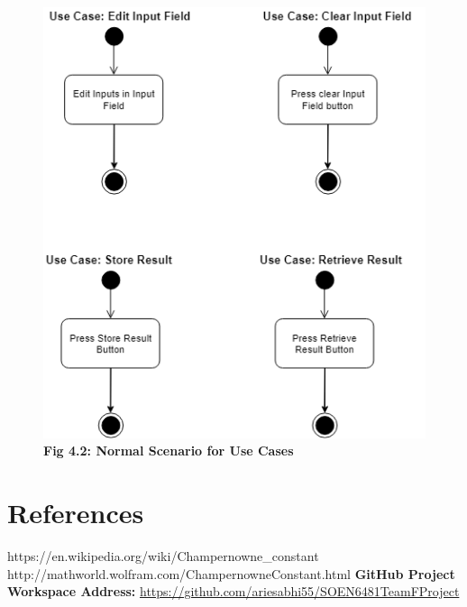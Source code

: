 \documentclass[paper=a4, fontsize=11pt]{report}
\numberwithin{equation}{section}		%
\numberwithin{figure}{section}			%
\numberwithin{table}{section}				%
\begin{document}
\pagebreak
\begin{figure}[htp]
    \centering
    \includegraphics[width=15cm]{NormalScenario2.png}
    \caption*{\textbf{Fig 4.2: Normal Scenario for Use Cases}}
\end{figure}

\printglossary

\chapter{References}

https://en.wikipedia.org/wiki/Champernowne\_constant
\vskip1mm
http://mathworld.wolfram.com/ChampernowneConstant.html
\vskip1mm
\textbf{GitHub Project Workspace Address:} \url{https://github.com/ariesabhi55/SOEN6481TeamFProject} 
\end{document}
